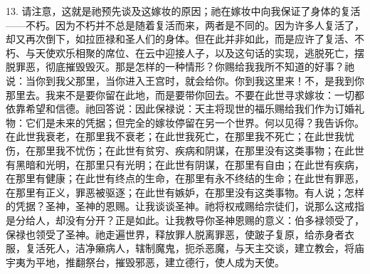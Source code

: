 13. 请注意，这就是祂预先谈及这嫁妆的原因；祂在嫁妆中向我保证了身体的复活——不朽。因为不朽并不总是随着复活而来，两者是不同的。因为许多人复活了，却又再次倒下，如拉匝禄和圣人们的身体。但在此并非如此，而是应许了复活、不朽、与天使欢乐相聚的席位、在云中迎接人子，以及这句话的实现，逃脱死亡，摆脱罪恶，彻底摧毁毁灭。那是怎样的一种情形？你赐给我我所不知道的好事？祂说：当你到我父那里，当你进入王宫时，就会给你。你到我这里来！不，是我到你那里去。我来不是要你留在此地，而是要带你回去。不要在此世寻求嫁妆：一切都依靠希望和信德。祂回答说：因此保禄说：天主将现世的福乐赐给我们作为订婚礼物：它们是未来的凭据；但完全的嫁妆停留在另一个世界。何以见得？我告诉你。在此世我衰老，在那里我不衰老；在此世我死亡，在那里我不死亡；在此世我忧伤，在那里我不忧伤；在此世有贫穷、疾病和阴谋，在那里没有这类事物；在此世有黑暗和光明，在那里只有光明；在此世有阴谋，在那里有自由；在此世有疾病，在那里有健康；在此世有终点的生命，在那里有永不终结的生命；在此世有罪恶，在那里有正义，罪恶被驱逐；在此世有嫉妒，在那里没有这类事物。有人说；怎样的凭据？圣神，圣神的恩赐。让我谈谈圣神。祂将权戒赐给宗徒们，说那么这戒指是分给人，却没有分开？正是如此。让我教导你圣神恩赐的意义：伯多禄领受了，保禄也领受了圣神。祂走遍世界，释放罪人脱离罪恶，使跛子复原，给赤身者衣服，复活死人，洁净癞病人，辖制魔鬼，扼杀恶魔，与天主交谈，建立教会，将庙宇夷为平地，推翻祭台，摧毁邪恶，建立德行，使人成为天使。\par


